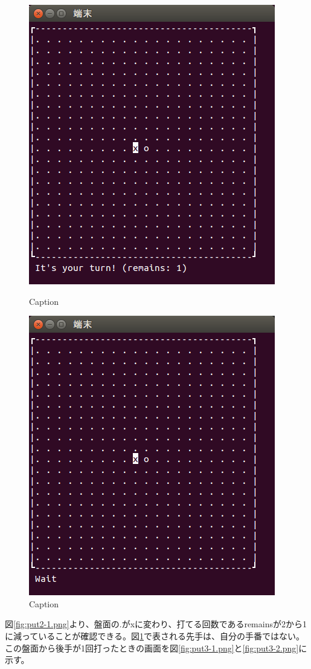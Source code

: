 \documentclass[a4j, titlepage, 10pt]{jsarticle}
\begin{document}
\begin{figure}[H]
  \begin{minipage}{0.5\hsize}
    \centering
    \includegraphics[scale=0.5]{img/put2-1.png}
    \caption{Caption}
    \label{fig:put2-1.png}
  \end{minipage}
  \begin{minipage}{0.5\hsize}
    \includegraphics[scale=0.5]{img/put2-2.png}
    \caption{Caption}
    \label{fig:put2-2.png}
  \end{minipage}
\end{figure}
図\ref{fig:put2-1.png}より、盤面の{\ttfamily .}が{\ttfamily x}に変わり、打てる回数である{\ttfamily remains}が2から1に減っていることが確認できる。図\ref{fig:put2-2.png}で表される先手は、自分の手番ではない。この盤面から後手が1回打ったときの画面を図\ref{fig:put3-1.png}と\ref{fig:put3-2.png}に示す。
\end{document}
